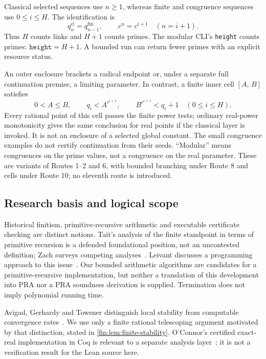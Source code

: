 \documentclass[11pt,reqno]{amsart}
\theoremstyle{blueplain}
\providecommand{\comma}{\allowbreak,\,}
\numberwithin{equation}{section}
\begin{document}
Classical selected sequences use \(n\ge1\), whereas finite and congruence
sequences use \(0\le i\le H\). The identification is
\[
q^{\mathrm{cl}}_n=q^{\mathrm{fin}}_{n-1}\comma\qquad
c^n=c^{i+1}\quad(n=i+1).
\]
Thus \(H\) counts links and \(H+1\) counts primes. The modular CLI's
\texttt{height} counts primes: \(\texttt{height}=H+1\).
A bounded run can return fewer primes with an explicit resource status.

An outer enclosure brackets a radical endpoint or, under a separate full
continuation premise, a limiting parameter. In contrast, a finite inner
cell \([A\comma B]\) satisfies
\[
0<A\le B\comma\qquad q_i<A^{c^{i+1}}\comma\qquad
B^{c^{i+1}}<q_i+1\quad(0\le i\le H).
\]
Every rational point of this cell passes the finite power tests; ordinary
real-power monotonicity gives the same conclusion for real points if the
classical layer is invoked. It is not an enclosure of a selected global
constant. The small congruence examples do not certify continuation from
their seeds. ``Modular'' means congruences on the prime values, not a
congruence on the real parameter. These are variants of Routes 1--2 and 6,
with bounded branching under Route 8 and cells under Route 10; no eleventh
route is introduced.

\subsection{Research basis and logical scope}
Historical finitism, primitive-recursive arithmetic and executable
certificate checking are distinct notions. Tait's analysis of the finite
standpoint in terms of primitive recursion is a defended foundational
position, not an uncontested definition; Zach surveys competing
analyses~\cite{Zach2023,Tait1981,Tait2012}. Leivant discusses a programming
approach to this issue~\cite{Leivant2021}. Our bounded arithmetic algorithms
are candidates for a primitive-recursive implementation, but neither a
translation of this development into PRA nor a PRA soundness derivation is
supplied. Termination does not imply polynomial running time.

Avigad, Gerhardy and Towsner distinguish local stability from computable
convergence rates~\cite{AvigadGerhardyTowsner2010}. We use only a finite
rational telescoping argument motivated by that distinction, stated in
\cref{fin:lem:finite-stability}. O'Connor's certified exact-real implementation
in Coq is relevant to a separate analysis layer~\cite{OConnor2008}; it is
not a verification result for the Lean source here.
\end{document}
